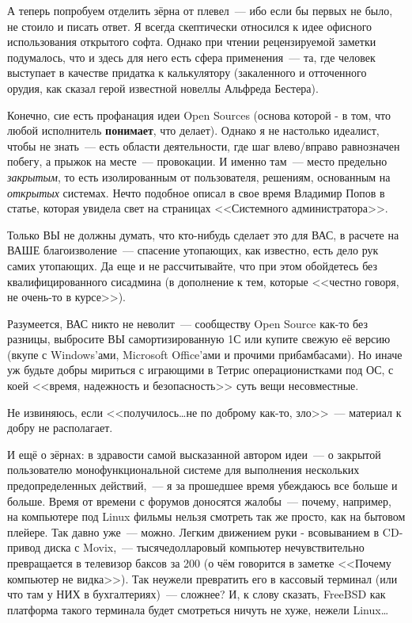 А теперь попробуем отделить зёрна от плевел~--- ибо если бы первых не было, не стоило и писать ответ. Я всегда скептически относился к идее офисного использования открытого софта. Однако при чтении рецензируемой заметки подумалось, что и здесь для него есть сфера применения~--- та, где человек выступает в качестве придатка к калькулятору (закаленного и отточенного орудия, как сказал герой известной новеллы Альфреда Бестера).

Конечно, сие есть профанация идеи Open Sources (основа которой - в том, что любой исполнитель \textbf{понимает}, что делает). Однако я не настолько идеалист, чтобы не знать~--- есть области деятельности, где шаг влево/вправо равнозначен побегу, а прыжок на месте~--- провокации. И именно там~--- место предельно \textit{закрытым}, то есть изолированным от пользователя, решениям, основанным на \textit{открытых} системах. Нечто подобное описал в свое время Владимир Попов в статье, которая увидела свет на страницах <<Системного администратора>>. 

Только ВЫ не должны думать, что кто-нибудь сделает это для ВАС, в расчете на ВАШЕ благоизволение~--- спасение утопающих, как известно, есть дело рук самих утопающих. Да еще и не рассчитывайте, что при этом обойдетесь без квалифицированного сисадмина (в дополнение к тем, которые <<честно говоря, не очень-то в курсе>>).

Разумеется, ВАС никто не неволит~--- сообществу Open Source как-то без разницы, выбросите ВЫ самортизированную 1С или купите свежую её версию (вкупе с Windows'ами, Microsoft Office'ами и прочими прибамбасами). Но иначе уж будьте добры мириться с играющими в Тетрис операционистками под ОС, с коей <<время, надежность и безопасность>> суть вещи несовместные.

Не извиняюсь, если <<получилось\dots не по доброму как-то, зло>>~--- материал к добру не располагает.

И ещё о зёрнах: в здравости самой высказанной автором идеи~--- о закрытой пользователю монофункциональной системе для выполнения нескольких предопределенных действий,~--- я за прошедшее время убеждаюсь все больше и больше. Время от времени с форумов доносятся жалобы~--- почему, например, на компьютере под Linux фильмы нельзя смотреть так же просто, как на бытовом плейере. Так давно уже~--- можно. Легким движением руки - всовыванием в CD-привод диска с Movix,~---  тысячедолларовый компьютер нечувствительно превращается в телевизор баксов за 200 (о чём говорится в заметке <<Почему компьютер не видка>>). Так неужели превратить его в кассовый терминал (или что там у НИХ в бухгалтериях)~--- сложнее? И, к слову сказать, FreeBSD как платформа такого терминала будет смотреться ничуть не хуже, нежели Linux\dots